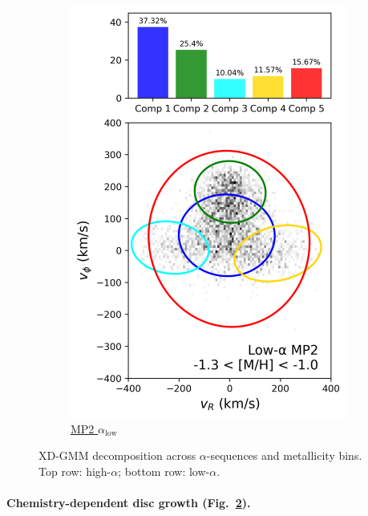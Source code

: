 \documentclass[a4paper,10pt]{article}
\begin{document}
\begin{multicols}{2}
\begin{figure}[H]
\begin{subfigure}[t]{0.24\linewidth}
    \includegraphics[width=\linewidth]{../figures/gmm_mp2_low_alpha_k6.png}
    \caption{\href{https://raw.githack.com/raunaq-rai/Disentangling-the-Milky-Way-using-GMM/main/figures/MP2\_low\_\_\_\_-1.3\%5BM\_H\%5D-1.0.html}{MP2 $\alpha_{\mathrm{low}}$}}
    \label{fig:low_mp2}
  \end{subfigure}


  \caption{XD-GMM decomposition across $\alpha$-sequences and metallicity bins. Top row: high-$\alpha$; bottom row: low-$\alpha$.}
  \label{fig:gmm_alpha_bins}
\end{figure}

\paragraph{Chemistry-dependent disc growth (Fig.~\ref{fig:gmm_alpha_bins}).}


\end{multicols}
\end{document}
